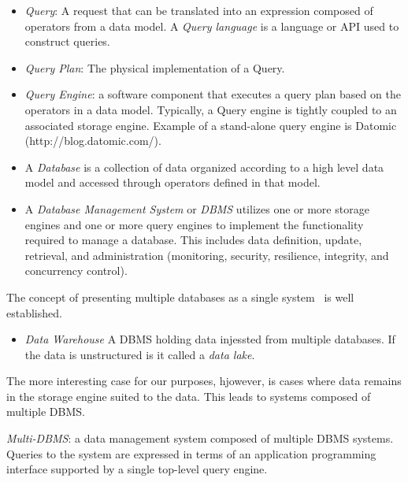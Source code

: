 \documentclass[conference]{IEEEtran}
\newcommand{\term}[1]{\emph{#1}}
\begin{document}
\begin{itemize}

\item \term{Query}: A request that can be translated into an 
expression composed of operators from a data model.  
A \term{Query language} is a language or API used to 
construct queries.

\item \term{Query Plan}: The physical 
implementation of a Query.

\item \term{Query Engine}: a software component that
executes a query plan based on the operators in a data model. 
Typically, a Query engine is tightly coupled to an associated
storage engine.  Example of a stand-alone query engine 
is Datomic (http://blog.datomic.com/).  

\item A \term{Database} is a collection of data organized according
to a high level data model and accessed through operators 
defined in that model.

\item A \term{Database Management System} or \term{DBMS} 
utilizes one or more storage engines and one or more query engines 
to implement the functionality required to manage a database.  This
includes data definition, update, retrieval, and administration 
(monitoring, security, resilience, integrity, and concurrency control).  

\end{itemize}

The concept of presenting multiple databases as a single
system~\cite{Nordbotten1991} is well established.  

\begin{itemize}
\item \term{Data Warehouse} A DBMS holding data injessted from
multiple databases.  If the data is unstructured is it called
a \term{data lake}.
 
\end{itemize}

The more interesting case for our purposes, hjowever, is cases
where data remains in the storage engine suited to the data.   
This leads to systems composed of multiple DBMS.


\item \term{Multi-DBMS}: a data management system composed of 
multiple DBMS systems.  Queries to the system are expressed
in terms of an application programming interface supported 
by a single top-level query engine.
\end{document}
